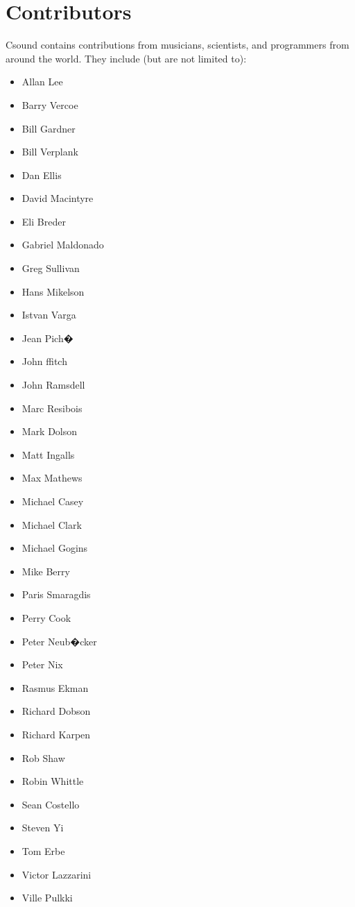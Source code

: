 \documentclass[10pt,letterpaper,onecolumn]{ltxguide}
\begin{document}
\section{Contributors}
Csound contains contributions from musicians, scientists, and programmers from around the world. They include (but are not limited to): 
\begin{itemize}
\item Allan Lee 
\item Barry Vercoe
\item Bill Gardner 
\item Bill Verplank 
\item Dan Ellis 
\item David Macintyre 
\item Eli Breder 
\item Gabriel Maldonado  
\item Greg Sullivan 
\item Hans Mikelson 
\item Istvan Varga 
\item Jean Pich� 
\item John ffitch 
\item John Ramsdell 
\item Marc Resibois 
\item Mark Dolson 
\item Matt Ingalls 
\item Max Mathews 
\item Michael Casey 
\item Michael Clark 
\item Michael Gogins 
\item Mike Berry 
\item Paris Smaragdis 
\item Perry Cook 
\item Peter Neub�cker 
\item Peter Nix 
\item Rasmus Ekman 
\item Richard Dobson 
\item Richard Karpen 
\item Rob Shaw 
\item Robin Whittle 
\item Sean Costello 
\item Steven Yi 
\item Tom Erbe 
\item Victor Lazzarini  
\item Ville Pulkki 
\end{itemize}
\end{document}
